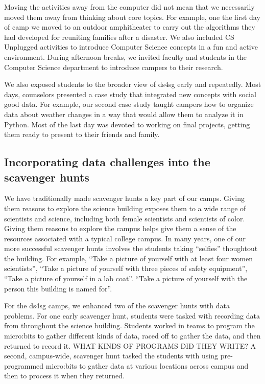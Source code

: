 Moving the activities away from the computer did not mean that we
necessarily moved them away from thinking about core topics.  For
example, one the first day of camp we moved to an outdoor amphitheater
to carry out the algorithms they had developed for reuniting families
after a disaster.  We also included CS Unplugged \cite{csunplugged}
activities to introduce Computer Science concepts in a fun and
active environment.  During afternoon breaks, we invited faculty
and students in the Computer Science department to introduce campers
to their research.  

We also exposed students to the broader view of ds4sg early and
repeatedly.  Most days, counselors presented a case study that
integrated new concepts with social good data. For example, our
second case study taught campers how to organize data about weather
changes in a way that would allow them to analyze it in Python.
Most of the last day was devoted to working on final projects,
getting them ready to present to their friends and family.

\subsection{Incorporating data challenges into the scavenger hunts}

We have traditionally made scavenger hunts a key part of our camps.
Giving them reasons to explore the science building exposes them to
a wide range of scientists and science, including both female scientists
and scientists of color.  Giving them reasons to explore the campus
helps give them a sense of the resources associated with a typical
college campus.  In many years, one of our more successful scavenger
hunts involves the students taking ``selfies'' thoughtout the
building.  For example, ``Take a picture of yourself with at least
four women scientists'', ``Take a picture of yourself with three
pieces of safety equipment'', ``Take a picture of yourself in a lab
coat''.  ``Take a picture of yourself with the person this building
is named for''.

For the ds4sg camps, we enhanced two of the scavenger hunts with
data problems.  For one early scavenger hunt, students were tasked
with recording data from throughout the science building.  Students
worked in teams to program the micro:bits to gather different kinds
of data, raced off to gather the data, and then returned to record it.
WHAT KINDS OF PROGRAMS DID THEY WRITE?  A second, campus-wide, scavenger
hunt tasked the students with using pre-programmed micro:bits to
gather data at various locations across campus and then to process it
when they returned.  


